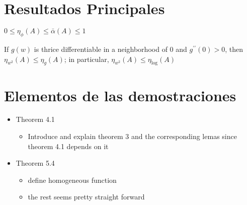 \documentclass[11pt]{article}
\begin{document}
\section{Resultados Principales}
\begin{theorem*}[4.1]
    $0 \leq \eta_{\phi}(A) \leq \bar{\alpha}(A) \leq 1$
\end{theorem*}
\begin{theorem*}[5.4]
    If $g(w)$ is thrice differentiable in a neighborhood of $0$ and $g^{\prime\prime} (0) > 0$, then $\eta_{w^2}(A) \leq \eta_g(A)$; in particular, $\eta_{w^2}(A) \leq \eta_{\operatorname{log}}(A)$
\end{theorem*}
\section{Elementos de las demostraciones}
\begin{itemize}
    \item Theorem 4.1
    \begin{itemize}
        \item Introduce and explain theorem 3 and the corresponding lemas since theorem 4.1 depends on it
    \end{itemize}
    \item Theorem 5.4
    \begin{itemize}
        \item define homogeneous function
        \item the rest seems pretty straight forward
    \end{itemize}
\end{itemize}
\end{document}
